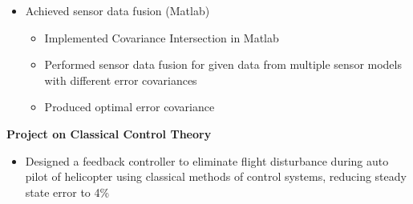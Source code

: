 \documentclass[10pt,a4paper]{extarticle}
\begin{document}
\begin{itemize}[leftmargin = 0.6cm]
\item Achieved sensor data fusion (Matlab)
\vspace{-0.6em}
\begin{itemize}[leftmargin = 0.3cm]
\setlength\itemsep{-0.2em}
\item Implemented Covariance Intersection in Matlab
\item Performed sensor data fusion for given data from multiple sensor models with different error covariances
\item Produced optimal error covariance
\end{itemize}
\end{itemize}
\textbf{Project on Classical Control Theory}
\vspace{-0.5em}
\begin{itemize}[leftmargin = 0.6cm]
\item Designed a feedback controller to eliminate flight disturbance during auto pilot of helicopter using classical methods of control systems, reducing steady state error to 4\%
\end{itemize}
\vspace{-0.4em}
\end{document}
